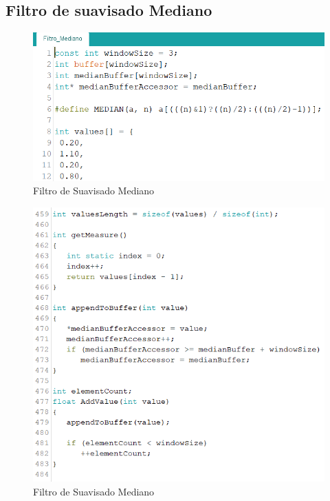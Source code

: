 \documentclass[10pt,a4paper]{article}
\begin{document}
\begin{multicols}{2}
\begin{itemize}
\subsection{Filtro de suavisado Mediano}
\begin{figure}[H]
\centering
\includegraphics[scale=0.65]{coddianouno.PNG}
\caption{Filtro de Suavisado Mediano}
\end{figure}


\begin{figure}[H]
\centering
\includegraphics[scale=0.65]{coddianodos.PNG}
\caption{Filtro de Suavisado Mediano}
\end{figure}


\end{itemize}
\end{multicols}
\end{document}
